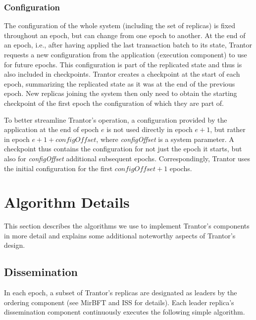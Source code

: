\documentclass{article}
\begin{document}
\subsubsection{Configuration}

The configuration of the whole system (including the set of replicas) is fixed throughout an epoch,
but can change from one epoch to another.
At the end of an epoch, i.e., after having applied the last transaction batch to its state,
Trantor requests a new configuration from the application (execution component) to use for future epochs.
This configuration is part of the replicated state and thus is also included in checkpoints.
Trantor creates a checkpoint at the start of each epoch,
summarizing the replicated state as it was at the end of the previous epoch.
New replicas joining the system then only need to obtain the starting checkpoint
of the first epoch the configuration of which they are part of.

To better streamline Trantor’s operation,
a configuration provided by the application at the end of epoch $e$ is not used directly in epoch $e+1$,
but rather in epoch $e+1+\textit{configOffset}$, where \textit{configOffset} is a system parameter.
A checkpoint thus contains the configuration for not just the epoch it starts,
but also for \textit{configOffset} additional subsequent epochs.
Correspondingly, Trantor uses the initial configuration for the first $\textit{configOffset}+1$ epochs.

\section{Algorithm Details}
\label{sec:algorithm-details}

This section describes the algorithms we use to implement Trantor’s components in more detail
and explains some additional noteworthy aspects of Trantor’s design.

\subsection{Dissemination}

In each epoch, a subset of Trantor’s replicas are designated as leaders by the ordering component
(see MirBFT \cite{mirbft} and ISS \cite{iss} for details).
Each leader replica’s dissemination component continuously executes the following simple algorithm.
\end{document}
